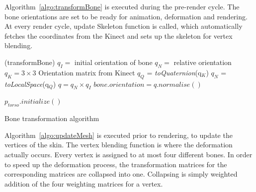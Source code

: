 Algorithm~\ref{algo:transformBone} is executed during the pre-render cycle. The bone orientations are set to be ready for animation, deformation and rendering. At every render cycle, update Skeleton function is called, which automatically fetches the coordinates from the Kinect and sets up the skeleton for vertex blending. 

\begin{algorithm}[ht]
\DontPrintSemicolon %
\function(transformBone){
$q_I =$ initial orientation of bone\;
$q_N =$ relative orientation\;
$q_K = 3\times3$ Orientation matrix from Kinect\;
 {
  $q_Q$ = \textit{toQuaternion}(q$_K$)\;
  $q_N$ = \textit{toLocalSpace}(q$_Q$)\;
  $q = q_N \times q_I$\;
  $\textit{bone.orientation} = \textit{q.normalise}{\left(\right)}$\; }}

 {
  $p_\textit{torso}.\textit{initialize}()$  \;
 }
\caption{Bone transformation algorithm}
\label{algo:transformBone}
\end{algorithm}

Algorithm~\ref{algo:updateMesh} is executed prior to rendering, to update the vertices of the skin. The vertex blending function is where the deformation
actually occurs. Every vertex is assigned to at most four different bones. In order to speed up the deformation process, the transformation matrices for the corresponding matrices are collapsed into one. Collapsing is simply weighted addition of the four weighting matrices for a vertex.


